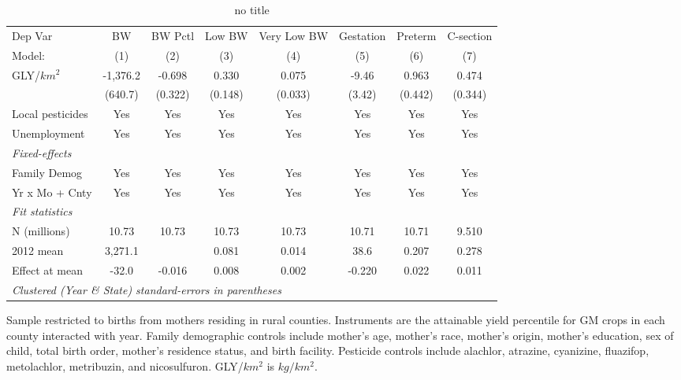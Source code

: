 \begin{table}[htbp]
   \centering
   \begin{threeparttable}[b]
      \caption{\label{tab:main-outcomes} no title}
      \begin{tabular}{lccccccc}
         \toprule
         Dep Var          & BW       & BW Pctl & Low BW  & Very Low BW & Gestation & Preterm & C-section\\  
         Model:           & (1)      & (2)     & (3)     & (4)         & (5)       & (6)     & (7)\\  
         \midrule 
         GLY/$km^2$       & -1,376.2 & -0.698  & 0.330   & 0.075       & -9.46     & 0.963   & 0.474\\   
                          & (640.7)  & (0.322) & (0.148) & (0.033)     & (3.42)    & (0.442) & (0.344)\\   
         Local pesticides & Yes      & Yes     & Yes     & Yes         & Yes       & Yes     & Yes\\  
         Unemployment     & Yes      & Yes     & Yes     & Yes         & Yes       & Yes     & Yes\\  
         \midrule
         \emph{Fixed-effects}\\
         Family Demog     & Yes      & Yes     & Yes     & Yes         & Yes       & Yes     & Yes\\  
         Yr x Mo + Cnty   & Yes      & Yes     & Yes     & Yes         & Yes       & Yes     & Yes\\  
         \midrule
         \emph{Fit statistics}\\
         N (millions)     & 10.73    & 10.73   & 10.73   & 10.73       & 10.71     & 10.71   & 9.510\\  
         2012 mean        & 3,271.1  &         & 0.081   & 0.014       & 38.6      & 0.207   & 0.278\\  
         Effect at mean   & -32.0    & -0.016  & 0.008   & 0.002       & -0.220    & 0.022   & 0.011\\  
         \midrule
         \multicolumn{8}{l}{\emph{Clustered (Year \& State) standard-errors in parentheses}}\\
      \end{tabular}
      
      \begin{tablenotes}\item Sample restricted to births from mothers residing in rural counties. Instruments are the attainable yield percentile for GM crops in each county interacted with year. Family demographic controls include mother's age, mother's race, mother's origin, mother's education, sex of child, total birth order, mother's residence status, and birth facility. Pesticide controls include alachlor, atrazine, cyanizine, fluazifop, metolachlor, metribuzin, and nicosulfuron. GLY/$km^2$ is $kg/km^2$.
      \end{tablenotes}
   \end{threeparttable}
\end{table}
